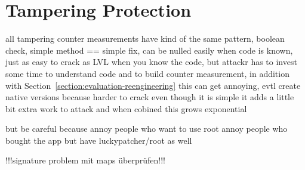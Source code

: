 \section{Tampering Protection} \label{section:evaluation-tampering}
all tampering counter measurements have kind of the same pattern, boolean check, simple method == simple fix, can be nulled easily when code is known, just as easy to crack as LVL when you know the code, but attackr has to invest some time to understand code and to build counter measurement, in addition with Section~\ref{section:evaluation-reengineering} this can get annoying, evtl create native versions because harder to crack
even though it is simple it adds a little bit extra work to attack and when cobined this grows exponential

but be careful because
annoy people who want to use root
annoy people who bought the app but have luckypatcher/root as well


!!!signature problem  mit maps überprüfen!!!
